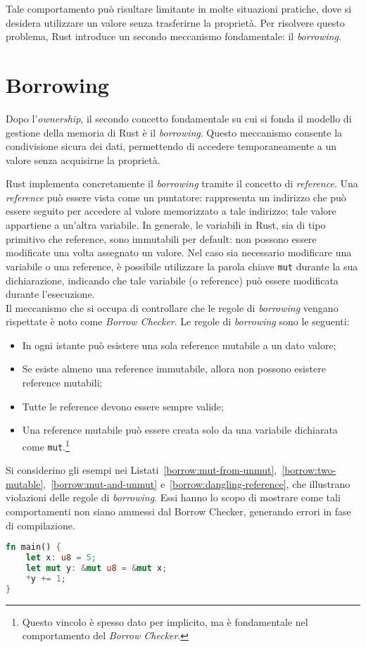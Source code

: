 Tale comportamento può risultare limitante in molte situazioni pratiche, dove si desidera utilizzare un valore senza trasferirne la proprietà. Per risolvere questo problema, Rust introduce un secondo meccanismo fondamentale: il \textit{borrowing}.

\section{Borrowing}
Dopo l'\textit{ownership}, il secondo concetto fondamentale su cui si fonda il modello di gestione della memoria di Rust è il \textit{borrowing}. Questo meccanismo consente la condivisione sicura dei dati, permettendo di accedere temporaneamente a un valore senza acquisirne la proprietà.

Rust implementa concretamente il \textit{borrowing} tramite il concetto di \textit{reference}. Una \textit{reference} può essere vista come un puntatore: rappresenta un indirizzo che può essere seguito per accedere al valore memorizzato a tale indirizzo; tale valore appartiene a un'altra variabile.
\break  \break
\noindent In generale, le variabili in Rust, sia di tipo primitivo che reference, sono immutabili per default: non possono essere modificate una volta assegnato un valore. Nel caso sia necessario modificare una variabile o una reference, è possibile  utilizzare la parola chiave \texttt{mut} durante la sua dichiarazione, indicando che tale variabile (o reference) può essere modificata durante l'esecuzione. \hfill
\vspace{10pt}\\
\noindent Il meccanismo che si occupa di controllare che le regole di \textit{borrowing} vengano rispettate è noto come \textit{Borrow Checker}. Le regole di \textit{borrowing} sono le seguenti:
\begin{itemize}
    \item In ogni istante può esistere una sola reference mutabile a un dato valore;
    \item Se esiste almeno una reference immutabile, allora non possono esistere reference mutabili;
    \item Tutte le reference devono essere sempre valide;
    \item Una reference mutabile può essere creata solo da una variabile dichiarata come \texttt{mut}.\footnote{Questo vincolo è spesso dato per implicito, ma è fondamentale nel comportamento del \textit{Borrow Checker}.}
\end{itemize}
Si considerino gli esempi nei Listati~\ref{borrow:mut-from-unmut},~\ref{borrow:two-mutable},~\ref{borrow:mut-and-unmut} e~\ref{borrow:dangling-reference}, che illustrano violazioni delle regole di \textit{borrowing}. Essi hanno lo scopo di mostrare come tali comportamenti non siano ammessi dal Borrow Checker, generando errori in fase di compilazione.
\begin{lstlisting}[language=Rust, caption={Reference mutabile a variabile immutabile}, label={borrow:mut-from-unmut}]
fn main() {
    let x: u8 = 5;
    let mut y: &mut u8 = &mut x;
    *y += 1;
}
\end{lstlisting}

